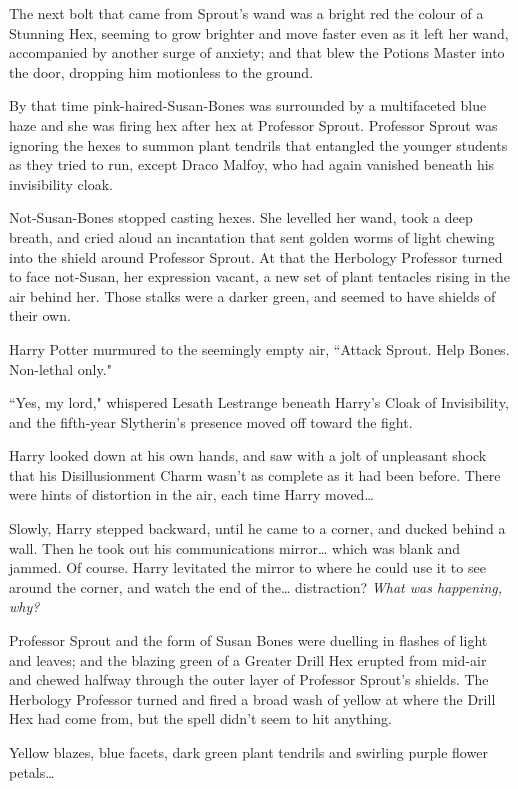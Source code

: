 The next bolt that came from Sprout's wand was a bright red the colour of a Stunning Hex, seeming to grow brighter and move faster even as it left her wand, accompanied by another surge of anxiety; and that blew the Potions Master into the door, dropping him motionless to the ground.

By that time pink-haired-Susan-Bones was surrounded by a multifaceted blue haze and she was firing hex after hex at Professor Sprout. Professor Sprout was ignoring the hexes to summon plant tendrils that entangled the younger students as they tried to run, except Draco Malfoy, who had again vanished beneath his invisibility cloak.

Not-Susan-Bones stopped casting hexes. She levelled her wand, took a deep breath, and cried aloud an incantation that sent golden worms of light chewing into the shield around Professor Sprout. At that the Herbology Professor turned to face not-Susan, her expression vacant, a new set of plant tentacles rising in the air behind her. Those stalks were a darker green, and seemed to have shields of their own.

Harry Potter murmured to the seemingly empty air, ``Attack Sprout. Help Bones. Non-lethal only."

``Yes, my lord," whispered Lesath Lestrange beneath Harry's Cloak of Invisibility, and the fifth-year Slytherin's presence moved off toward the fight.

Harry looked down at his own hands, and saw with a jolt of unpleasant shock that his Disillusionment Charm wasn't as complete as it had been before. There were hints of distortion in the air, each time Harry moved{\ldots}

Slowly, Harry stepped backward, until he came to a corner, and ducked behind a wall. Then he took out his communications mirror{\ldots} which was blank and jammed. Of course. Harry levitated the mirror to where he could use it to see around the corner, and watch the end of the{\ldots} distraction? \emph{What was happening, why?}

Professor Sprout and the form of Susan Bones were duelling in flashes of light and leaves; and the blazing green of a Greater Drill Hex erupted from mid-air and chewed halfway through the outer layer of Professor Sprout's shields. The Herbology Professor turned and fired a broad wash of yellow at where the Drill Hex had come from, but the spell didn't seem to hit anything.

Yellow blazes, blue facets, dark green plant tendrils and swirling purple flower petals{\ldots}

